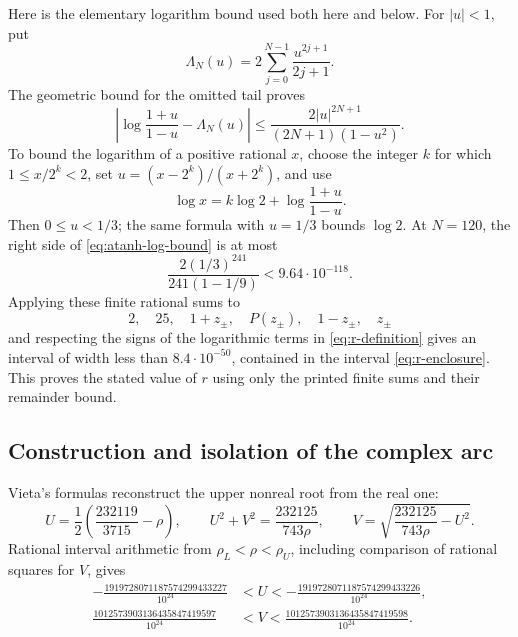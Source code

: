 \documentclass[11pt,reqno,letterpaper]{amsart}
\numberwithin{equation}{section}
\theoremstyle{definition}
\theoremstyle{remark}
\begin{document}
Here is the elementary logarithm bound used both here and below.  For
\(|u|<1\), put
\[
 \Lambda_N(u)=2\sum_{j=0}^{N-1}\frac{u^{2j+1}}{2j+1}.
\]
The geometric bound for the omitted tail proves
\begin{equation}\label{eq:atanh-log-bound}
 \left|\log\frac{1+u}{1-u}-\Lambda_N(u)\right|
 \leq\frac{2|u|^{2N+1}}{(2N+1)(1-u^2)}.
\end{equation}
To bound the logarithm of a positive rational \(x\), choose the integer
\(k\) for which \(1\leq x/2^k<2\), set
\(u=(x-2^k)/(x+2^k)\), and use
\[
 \log x=k\log2+\log\frac{1+u}{1-u}.
\]
Then \(0\leq u<1/3\); the same formula with \(u=1/3\) bounds
\(\log2\).  At \(N=120\), the right side of
\eqref{eq:atanh-log-bound} is at most
\[
 \frac{2(1/3)^{241}}{241(1-1/9)}<9.64\cdot10^{-118}.
\]
Applying these finite rational sums to
\[
 2,\quad25,\quad1+z_\pm,\quad P(z_\pm),\quad
 1-z_\pm,\quad z_\pm
\]
and respecting the signs of the logarithmic terms in
\eqref{eq:r-definition} gives an interval of width less than
\(8.4\cdot10^{-50}\), contained in the interval
\eqref{eq:r-enclosure}.  This proves the stated value of \(r\) using
only the printed finite sums and their remainder bound.

\subsection{Construction and isolation of the complex arc}
\label{subsec:complex-arc-calculations}

Vieta's formulas reconstruct the upper nonreal root from the real one:
\begin{equation}\label{eq:Vieta-complex-root}
 U=\frac12\left(\frac{232119}{3715}-\rho\right),\qquad
 U^2+V^2=\frac{232125}{743\rho},\qquad
 V=\sqrt{\frac{232125}{743\rho}-U^2}.
\end{equation}
Rational interval arithmetic from \(\rho_L<\rho<\rho_U\), including
comparison of rational squares for \(V\), gives
\begin{equation}\label{eq:UV-isolation}
 \begin{aligned}
 -\frac{1919728071187574299433227}{10^{24}}
 &<U<
 -\frac{1919728071187574299433226}{10^{24}},\\
 \frac{1012573903136435847419597}{10^{24}}
 &<V<
 \frac{1012573903136435847419598}{10^{24}}.
 \end{aligned}
\end{equation}
\end{document}
